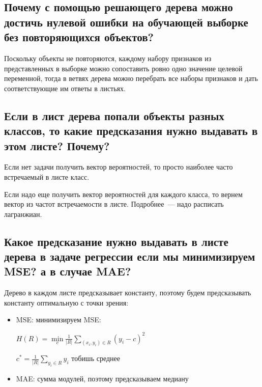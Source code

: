 \subsection{Почему с помощью решающего дерева можно достичь нулевой ошибки на обучающей
выборке без повторяющихся объектов?}

Поскольку объекты не повторяются, каждому набору признаков из представленных в выборке можно сопоставить ровно одно значение целевой переменной, тогда в ветвях дерева можно перебрать все наборы признаков и дать соответствующие им ответы в листьях.














\subsection{Если в лист дерева попали объекты разных классов, то какие предсказания нужно выдавать в этом листе? Почему?}

Если нет задачи получить вектор вероятностей, то просто наиболее часто встречаемый в листе класс.

Если надо еще получить вектор вероятностей для каждого класса, то вернем вектор из частот встречаемости в листе. Подробнее~--- надо расписать лагранжиан.
















\subsection{Какое предсказание нужно выдавать в листе дерева в задаче регрессии если мы
минимизируем MSE? а в случае MAE?}

Дерево в каждом листе предсказывает константу, поэтому будем предсказывать константу оптимальную с точки зрения:

\begin{itemize}
    \item MSE: минимизируем MSE:
    
    $H(R) =\min\limits_c \frac{1}{|R|} \sum\limits_{(x_i, y_i) \in R} (y_i - c)^2$
    
    $c^* = \frac{1}{|R|} \sum \limits_{y_i \in R} y_i$ тобишь среднее
    
    \item MAE: сумма модулей, поэтому предсказываем медиану
\end{itemize}













